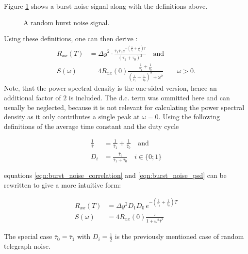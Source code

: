 Figure \ref{fig:burst_noise} shows a burst noise signal along with the definitions above.

\begin{figure}[hb]
    \centering
    \caption{A random burst noise signal.}
    \label{fig:burst_noise}
\end{figure}

Using these definitions, one can then derive \cite{burst_noise_wiener_khinchin}:
\begin{align}
    R_{xx} (T) &= \Delta y^2 \cdot \frac{\bar \tau_1 \bar \tau_0 e^{-\left(\frac{1}{\bar \tau_1}+\frac{1}{\bar \tau_0}\right)T}}{\left(\bar \tau_1 + \bar \tau_0\right)^2} \quad \text{and} \label{eqn:burst_noise_correlation}\\
    S(\omega) &= 4 R_{xx}(0) \frac{\frac{1}{\bar \tau_1} + \frac{1}{\bar \tau_0}}{\left(\frac{1}{\bar \tau_1} + \frac{1}{\bar \tau_0}\right)^2 + \omega^2} \qquad \omega > 0 . \label{eqn:burst_noise_psd}
\end{align}
Note, that the power spectral density is the one-sided version, hence an additional factor of $2$ is included. The d.c. term was ommitted here and can usually be neglected, because it is not relevant for calculating the power spectral density as it only contributes a single peak at $\omega=0$. Using the following definitions of the average time constant and the duty cycle

\begin{align}
    \frac{1}{\bar \tau} &= \frac{1}{\bar \tau_1} + \frac{1}{\bar \tau_0} \quad \mathrm{and} \label{eqn:definition_bar_tau}\\
    D_i &= \frac{\bar \tau_i}{\bar \tau_1 + \bar \tau_0} \quad i \in \{0 ; 1\}
\end{align}

equations \ref{eqn:burst_noise_correlation} and \ref{eqn:burst_noise_psd} can be rewritten to give a more intuitive form:

\begin{align}
    R_{xx} (T) &= \Delta y^2 D_1 D_0 \, e^{-\left(\frac{1}{\bar \tau_1}+\frac{1}{\bar \tau_0}\right)T}\\
    S(\omega) &= 4 R_{xx}(0) \frac{\bar \tau}{1 + \omega^2 \bar \tau^2} \label{eqn:burst_noise_lorentzian}
\end{align}

The special case $\bar \tau_0 = \bar \tau_1$ with $D_i=\frac 1 2$ is the previously mentioned case of random telegraph noise.

